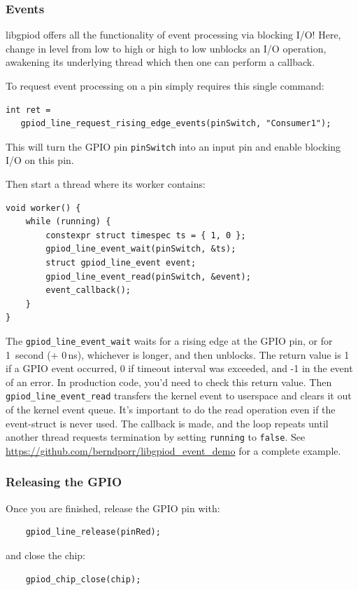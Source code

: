 \documentclass[12pt]{report}
\begin{document}
\subsubsection{Events}
libgpiod offers all the functionality of event processing via blocking I/O!
Here, change in level from low to high or high
to low unblocks an I/O operation, awakening its underlying
thread which then one can perform a callback.

To request event processing on a pin simply
requires this single
command:
\begin{verbatim}
int ret =
   gpiod_line_request_rising_edge_events(pinSwitch, "Consumer1");
\end{verbatim}
This will turn the GPIO pin \texttt{pinSwitch} into an input pin and enable
blocking I/O on this pin.

Then start a thread where its worker contains:
\begin{verbatim}
void worker() {
    while (running) {
        constexpr struct timespec ts = { 1, 0 };
        gpiod_line_event_wait(pinSwitch, &ts);
        struct gpiod_line_event event;
        gpiod_line_event_read(pinSwitch, &event);
        event_callback();
    }
}
\end{verbatim}
The \texttt{gpiod\_line\_event\_wait} waits for a rising edge at the GPIO
pin, or for 1~second (+ 0\,ns), whichever is longer, and then unblocks.
The return value is 1 if a GPIO event occurred, 0 if timeout interval
was exceeded, and -1 in the event of an error. In production code,
you'd need to check this return value.
Then \texttt{gpiod\_line\_event\_read} transfers the
kernel event to userspace and clears it out of the kernel event queue.
It's important to do the read operation
even if the event-struct is never used. The callback is made,
and the loop repeats until another thread requests termination
by setting \verb!running! to \verb!false!.
See \url{https://github.com/berndporr/libgpiod_event_demo} for a complete example.

\subsubsection{Releasing the GPIO}
Once you are finished, release the GPIO pin with:
\begin{verbatim}
    gpiod_line_release(pinRed);
\end{verbatim}
and close the chip:
\begin{verbatim}
    gpiod_chip_close(chip);
\end{verbatim}
\end{document}
